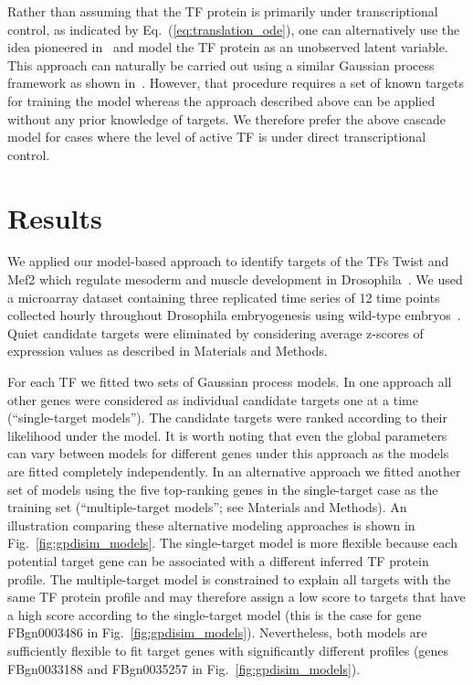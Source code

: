 \documentclass{pnastwo}
\begin{document}
\begin{article}
Rather than assuming that the TF protein is primarily under
transcriptional control, as indicated by
Eq.~(\ref{eq:translation_ode}), one can alternatively use the idea pioneered
in~\cite{Barenco2006a} and model the TF protein as an unobserved
latent variable. This approach can naturally be carried out using a
similar Gaussian process framework as shown in~\cite{Gao2008}. However, that procedure requires a set of known
targets for training the model whereas the approach described above
can be applied without any prior knowledge of targets. We therefore
prefer the above cascade model for cases where the level of active TF is under direct transcriptional control. 

\section{Results}

We applied our model-based approach to identify targets of the TFs
Twist and Mef2 which regulate mesoderm and muscle development in
Drosophila~\cite{Sandmann2007,Zinzen2009}. We used a microarray dataset
containing three replicated time series of 12 time points collected
hourly throughout Drosophila embryogenesis using wild-type
embryos~\cite{Tomancak2002}.  Quiet candidate targets were eliminated by 
considering average z-scores of expression values as described in
Materials and Methods.

For each TF we fitted two sets of Gaussian process models. In one
approach all other genes were considered as individual candidate targets one at a
time (``single-target models'').  The candidate targets were ranked
according to their likelihood under the model.  It is worth noting that even the global
parameters can vary between models for different genes under this approach as the models
are fitted completely independently. In an alternative approach we fitted another set of models using the five
top-ranking genes in the single-target case as the training set (``multiple-target models''; see
Materials and Methods).  An illustration comparing these alternative
modeling approaches is shown in Fig.~\ref{fig:gpdisim_models}. The
single-target model is more flexible because each
potential target gene can be associated with a different inferred TF
protein profile. The multiple-target model is constrained to explain
all targets with the same TF protein profile and may therefore assign
a low score to targets that have a high score according to the
single-target model (this is the case for gene FBgn0003486 in
Fig.~\ref{fig:gpdisim_models}). Nevertheless, both models are
sufficiently flexible to fit target genes with significantly different
profiles (genes FBgn0033188 and FBgn0035257 in
Fig.~\ref{fig:gpdisim_models}).


\end{article}
\end{document}
